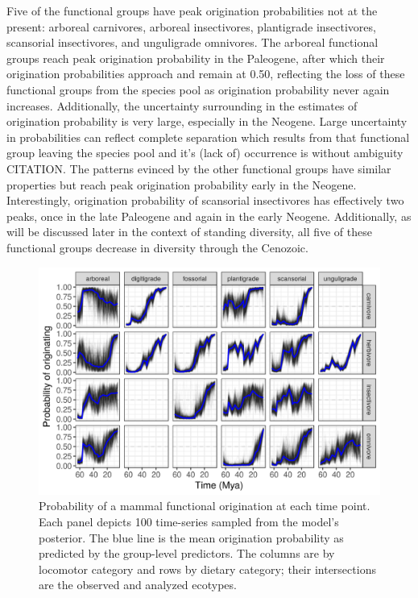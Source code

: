 \documentclass[12pt,letterpaper]{article}
\begin{document}
Five of the functional groups have peak origination probabilities not at the present: arboreal carnivores, arboreal insectivores, plantigrade insectivores, scansorial insectivores, and unguligrade omnivores. The arboreal functional groups reach peak origination probability in the Paleogene, after which their origination probabilities approach and remain at 0.50, reflecting the loss of these functional groups from the species pool as origination probability never again increases. Additionally, the uncertainty surrounding in the estimates of origination probability is very large, especially in the Neogene. Large uncertainty in probabilities can reflect complete separation which results from that functional group leaving the species pool and it's (lack of) occurrence is without ambiguity CITATION. The patterns evinced by the other functional groups have similar properties but reach peak origination probability early in the Neogene. Interestingly, origination probability of scansorial insectivores has effectively two peaks, once in the late Paleogene and again in the early Neogene. Additionally, as will be discussed later in the context of standing diversity, all five of these functional groups decrease in diversity through the Cenozoic. 
\begin{figure}[ht]
  \centering
  \includegraphics[width=\textwidth,height=0.4\textheight,keepaspectratio=true]{figure/ecotype_origin_bd}
  \caption[Estimates of functional group origination probability]{Probability of a mammal functional origination at each time point. Each panel depicts 100 time-series sampled from the model's posterior. The blue line is the mean origination probability as predicted by the group-level predictors. The columns are by locomotor category and rows by dietary category; their intersections are the observed and analyzed ecotypes. }
  \label{fig:eco_origin}
\end{figure}
\end{document}
